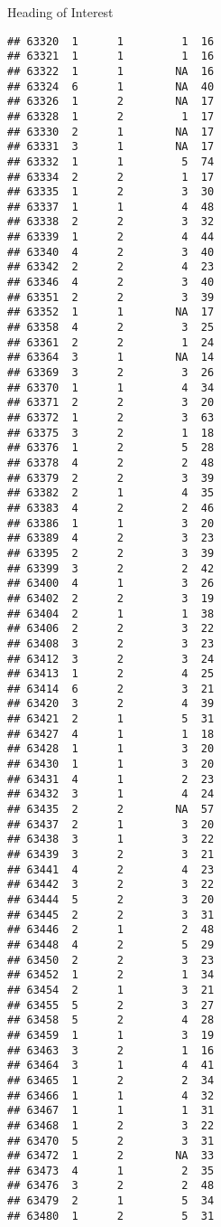\documentclass[
  ignorenonframetext,
]{beamer}
\begin{document}
\begin{frame}[fragile]{Heading of Interest}
\begin{verbatim}
## 63320  1      1         1  16
## 63321  1      1         1  16
## 63322  1      1        NA  16
## 63324  6      1        NA  40
## 63326  1      2        NA  17
## 63328  1      2         1  17
## 63330  2      1        NA  17
## 63331  3      1        NA  17
## 63332  1      1         5  74
## 63334  2      2         1  17
## 63335  1      2         3  30
## 63337  1      1         4  48
## 63338  2      2         3  32
## 63339  1      2         4  44
## 63340  4      2         3  40
## 63342  2      2         4  23
## 63346  4      2         3  40
## 63351  2      2         3  39
## 63352  1      1        NA  17
## 63358  4      2         3  25
## 63361  2      2         1  24
## 63364  3      1        NA  14
## 63369  3      2         3  26
## 63370  1      1         4  34
## 63371  2      2         3  20
## 63372  1      2         3  63
## 63375  3      2         1  18
## 63376  1      2         5  28
## 63378  4      2         2  48
## 63379  2      2         3  39
## 63382  2      1         4  35
## 63383  4      2         2  46
## 63386  1      1         3  20
## 63389  4      2         3  23
## 63395  2      2         3  39
## 63399  3      2         2  42
## 63400  4      1         3  26
## 63402  2      2         3  19
## 63404  2      1         1  38
## 63406  2      2         3  22
## 63408  3      2         3  23
## 63412  3      2         3  24
## 63413  1      2         4  25
## 63414  6      2         3  21
## 63420  3      2         4  39
## 63421  2      1         5  31
## 63427  4      1         1  18
## 63428  1      1         3  20
## 63430  1      1         3  20
## 63431  4      1         2  23
## 63432  3      1         4  24
## 63435  2      2        NA  57
## 63437  2      1         3  20
## 63438  3      1         3  22
## 63439  3      2         3  21
## 63441  4      2         4  23
## 63442  3      2         3  22
## 63444  5      2         3  20
## 63445  2      2         3  31
## 63446  2      1         2  48
## 63448  4      2         5  29
## 63450  2      2         3  23
## 63452  1      2         1  34
## 63454  2      1         3  21
## 63455  5      2         3  27
## 63458  5      2         4  28
## 63459  1      1         3  19
## 63463  3      2         1  16
## 63464  3      1         4  41
## 63465  1      2         2  34
## 63466  1      1         4  32
## 63467  1      1         1  31
## 63468  1      2         3  22
## 63470  5      2         3  31
## 63472  1      2        NA  33
## 63473  4      1         2  35
## 63476  3      2         2  48
## 63479  2      1         5  34
## 63480  1      2         5  31

\end{verbatim}
\end{frame}
\end{document}
